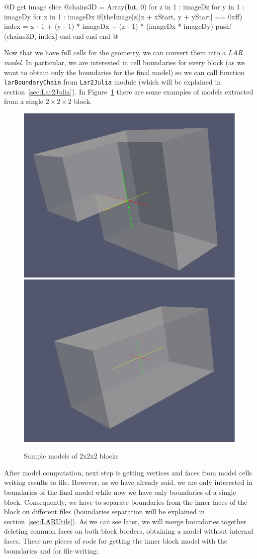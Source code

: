 \documentclass[11pt,oneside]{article}	%
\begin{document}
@D get image slice
@{chains3D = Array(Int, 0)
for z in 1 : imageDz
  for y in 1 : imageDy
    for x in 1 : imageDx
      if(theImage[z][x + xStart, y + yStart] == 0xff)
        index = x - 1 + (y - 1) * imageDx + (z - 1) * (imageDx * imageDy)
	push!(chains3D, index)
      end
    end
  end
end @}

Now that we have full cells for the geometry, we can convert them into a \textit{LAR model}. In particular, we are interested in cell boundaries for every block (as we want to obtain only the boundaries for the final model) so we can call function \texttt{larBoundaryChain} from \texttt{Lar2Julia} module (which will be explained in section~\ref{sec:Lar2Julia}). In Figure~\ref{fig:sampleBlocks} there are some examples of models extracted from a single $2 \times 2 \times 2$ block.

\begin{figure}[htb] %
   \centering
   \includegraphics[width=0.45\linewidth]{images/sampleBlock1.png} \hfill
   \includegraphics[width=0.45\linewidth]{images/sampleBlock2.png}
   \caption{Sample models of 2x2x2 blocks}
   \label{fig:sampleBlocks}
\end{figure}

After model computation, next step is getting vertices and faces from model cells writing results to file. However, as we have already said, we are only interested in boundaries of the final model while now we have only boundaries of a single block. Consequently, we have to separate boundaries from the inner faces of the block on different files (boundaries separation will be explained in section~\ref{sec:LARUtils}). As we can see later, we will merge boundaries together deleting common faces on both block borders, obtaining a model without internal faces. These are pieces of code for getting the inner block model with the boundaries and for file writing:
\end{document}

